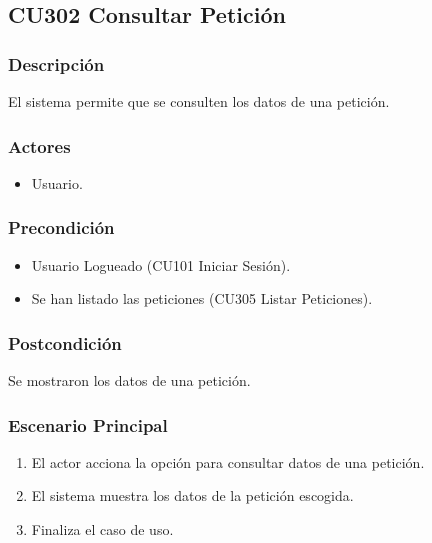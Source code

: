 \subsection{CU302 Consultar Petici\'{o}n}
\subsubsection{Descripci\'{o}n}
El sistema permite que se consulten los datos de una petici\'{o}n.
\subsubsection{Actores}
\begin{itemize}
\item Usuario.
\end{itemize}
\subsubsection{Precondici\'{o}n}
\begin{itemize}
\item Usuario Logueado (CU101 Iniciar Sesi\'{o}n).
\item Se han listado las peticiones (CU305 Listar Peticiones).
\end{itemize}
\subsubsection{Postcondici\'{o}n}
Se mostraron los datos de una petici\'{o}n.
\subsubsection{Escenario Principal}
\begin{enumerate}
\item El actor acciona la opci\'{o}n para consultar datos de una petici\'{o}n.
\item El sistema muestra los datos de la petici\'{o}n escogida.
\item Finaliza el caso de uso.
\end{enumerate}